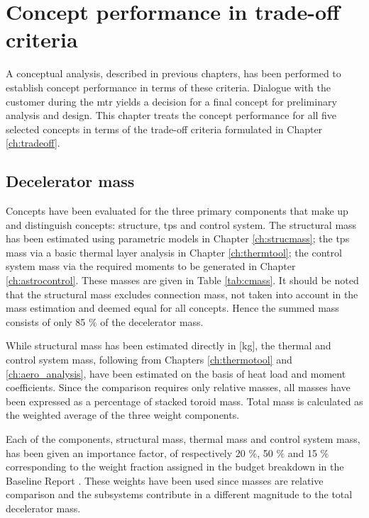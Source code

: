 \section{Concept performance in trade-off criteria}\label{ch:tfsum}

 A conceptual analysis, described in previous chapters, has been performed to establish concept performance in terms of these criteria. Dialogue with the customer during the \acrfull{mtr} yields a decision for a final concept for preliminary analysis and design. This chapter treats the concept performance for all five selected concepts in terms of the trade-off criteria formulated in Chapter \ref{ch:tradeoff}.

\subsection{Decelerator mass}
Concepts have been evaluated for the three primary components that make up and distinguish concepts: structure, \acrfull{tps} and control system. The structural mass has been estimated using parametric models in Chapter \ref{ch:strucmass}; the \gls{tps} mass via a basic thermal layer analysis in Chapter \ref{ch:thermtool}; the control system mass via the required moments to be generated in Chapter \ref{ch:astrocontrol}.  These masses are given in Table \ref{tab:cmass}. It should be noted that the structural mass excludes connection mass, not taken into account in the mass estimation and deemed equal for all concepts. Hence the summed mass consists of only 85 $\%$ of the decelerator mass. 

While structural mass has been estimated directly in [kg], the thermal and control system mass, following from Chapters \ref{ch:thermotool} and \ref{ch:aero_analysis}, have been estimated on the basis of heat load and moment coefficients. Since the comparison requires only relative masses, all  masses have been expressed as a percentage of stacked toroid mass. Total mass is calculated as the weighted average of the three weight components.

Each of the components, structural mass, thermal mass and control system mass, has been given an importance factor, of respectively 20 $\%$,  50 $\%$ and  15 $\%$ corresponding to the weight fraction assigned in the budget breakdown in the Baseline Report \cite[p.28]{Balasooriyan2015a}. These weights have been used since masses are relative comparison and the subsystems contribute in a different magnitude to the total decelerator mass. 

